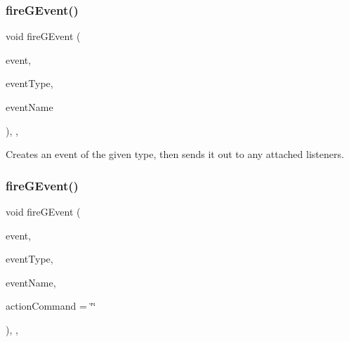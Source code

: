 \mbox{\label{classGObservable_abb0b2f66ba39211cb5d7615e9d1c04e2}} 
\subsubsection{\texorpdfstring{fire\+G\+Event()}{fireGEvent()}\hspace{0.1cm}{\footnotesize\ttfamily [3/8]}}
{\footnotesize\ttfamily void fire\+G\+Event (\begin{DoxyParamCaption}\item[{Q\+Key\+Event $\ast$}]{event,  }\item[{Event\+Type}]{event\+Type,  }\item[{const std\+::string \&}]{event\+Name }\end{DoxyParamCaption})\hspace{0.3cm}{\ttfamily [protected]}, {\ttfamily [virtual]}, {\ttfamily [inherited]}}



Creates an event of the given type, then sends it out to any attached listeners. 

\mbox{\label{classGObservable_a119318675d2165bdf7dd853aaf881d4b}} 
\subsubsection{\texorpdfstring{fire\+G\+Event()}{fireGEvent()}\hspace{0.1cm}{\footnotesize\ttfamily [4/8]}}
{\footnotesize\ttfamily void fire\+G\+Event (\begin{DoxyParamCaption}\item[{Q\+Mouse\+Event $\ast$}]{event,  }\item[{Event\+Type}]{event\+Type,  }\item[{const std\+::string \&}]{event\+Name,  }\item[{const std\+::string \&}]{action\+Command = {\ttfamily \char`\"{}\char`\"{}} }\end{DoxyParamCaption})\hspace{0.3cm}{\ttfamily [protected]}, {\ttfamily [virtual]}, {\ttfamily [inherited]}}



